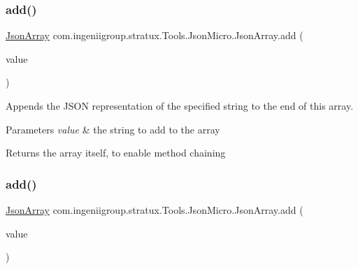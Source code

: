\subsubsection{\texorpdfstring{add()}{add()}\hspace{0.1cm}{\footnotesize\ttfamily [6/7]}}
{\footnotesize\ttfamily \hyperlink{classcom_1_1ingeniigroup_1_1stratux_1_1_tools_1_1_json_micro_1_1_json_array}{Json\+Array} com.\+ingeniigroup.\+stratux.\+Tools.\+Json\+Micro.\+Json\+Array.\+add (\begin{DoxyParamCaption}\item[{String}]{value }\end{DoxyParamCaption})}

Appends the J\+S\+ON representation of the specified string to the end of this array.


\begin{DoxyParams}{Parameters}
{\em value} & the string to add to the array \\
\hline
\end{DoxyParams}
\begin{DoxyReturn}{Returns}
the array itself, to enable method chaining 
\end{DoxyReturn}
\mbox{\label{classcom_1_1ingeniigroup_1_1stratux_1_1_tools_1_1_json_micro_1_1_json_array_a1c79490915c78c8446fd6a20b1c0f750}} 
\subsubsection{\texorpdfstring{add()}{add()}\hspace{0.1cm}{\footnotesize\ttfamily [7/7]}}
{\footnotesize\ttfamily \hyperlink{classcom_1_1ingeniigroup_1_1stratux_1_1_tools_1_1_json_micro_1_1_json_array}{Json\+Array} com.\+ingeniigroup.\+stratux.\+Tools.\+Json\+Micro.\+Json\+Array.\+add (\begin{DoxyParamCaption}\item[{\hyperlink{classcom_1_1ingeniigroup_1_1stratux_1_1_tools_1_1_json_micro_1_1_json_value}{Json\+Value}}]{value }\end{DoxyParamCaption})}

